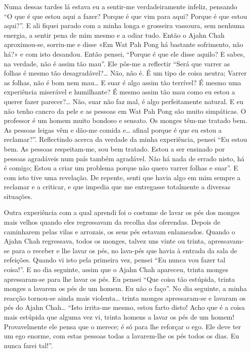 Numa dessas tardes lá estava eu a sentir-me verdadeiramente infeliz, pensando “O
que é que estou aqui a fazer? Porque é que vim para aqui? Porque é que estou
aqui?”. E ali fiquei parado com a minha longa e grosseira vassoura, sem nenhuma
energia, a sentir pena de mim mesmo e a odiar tudo. Então o Ajahn Chah
aproximou-se, sorriu-me e disse «Em Wat Pah Pong há bastante sofrimento, não
há?» e com isto desandou. Então pensei, “Porque é que ele disse aquilo? E sabes,
na verdade, não é assim tão mau”. Ele pôs-me a reflectir “Será que varrer as
folhas é mesmo tão desagradável?\ldots{} Não, não é. É um tipo de coisa neutra;
Varrer as folhas, não é bom nem mau\ldots{} E suar é algo assim tão terrível? É
mesmo uma experiência miserável e humilhante? É mesmo assim tão mau como eu
estou a querer fazer parecer?\ldots{} Não, suar não faz mal, é algo
perfeitamente natural. E eu não tenho cancro da pele e as pessoas em Wat Pah
Pong são muito simpáticas. O professor é um homem muito bondoso e sensato. Os
monges têm-me tratado bem. As pessoas leigas vêm e dão-me comida e\ldots{}
afinal porque é que eu estou a reclamar?”. Reflectindo acerca da verdade da
minha experiência, pensei “Eu estou bem. As pessoas respeitam-me, sou bem
tratado. Estou a ser ensinado por pessoas agradáveis num país também agradável.
Não há nada de errado nisto, há é comigo; Estou a criar um problema porque não
quero varrer folhas e suar”. E com isto tive uma revelação. De repente, senti
que havia algo em mim sempre a reclamar e a criticar, e que impedia que me
entregasse totalmente a diversas situações.

Outra experiência com a qual aprendi foi o costume de lavar os pés dos monges
mais velhos quando eles regressavam da recolha das oferendas. Depois de
caminharem pelas vilas e arrozais, os seus pés estavam enlameados. Quando o
Ajahn Chah regressava, todos os monges, talvez uns vinte ou trinta,
apressavam-se para o receber e lhe lavar os pés, no lava-pés que havia à entrada
da sala de refeições. Quando vi isto pela primeira vez, pensei “Eu nunca vou
fazer tal coisa!”. E no dia seguinte, assim que o Ajahn Chah apareceu, trinta
monges apressaram-se para lhe lavar os pés. Eu pensei “Que coisa tão estúpida,
trinta monges a lavarem os pés de um homem. Eu não o faço”. No dia seguinte, a
minha reacção tornou-se ainda mais violenta\ldots{} trinta monges apressaram-se e
lavaram os pés do Ajahn Chah\ldots{} “Isto irrita-me mesmo, estou farto disto! Acho
que é a coisa mais estúpida que alguma vez vi, trinta homens a lavar os pés de
um homem! Provavelmente ele pensa que o merece; é só para lhe reforçar o ego.
Ele deve ter um ego enorme, com estas pessoas todas a lavarem-lhe os pés todos
os dias. Eu nunca farei tal!”.

